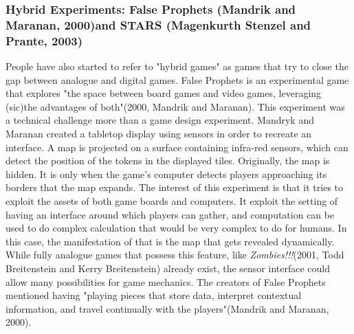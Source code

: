 \subsubsection{Hybrid Experiments: False Prophets (Mandrik and Maranan, 2000)and STARS (Magenkurth Stenzel and Prante, 2003)}
People have also started to refer to "hybrid games" as games that try to close the gap between analogue and digital games. False Prophets is an experimental game that explores "the space between board games and video games, leveraging (sic)the advantages of both"(2000, Mandrik and Maranan). This experiment was a technical challenge more than a game design experiment. Mandryk and Maranan created a tabletop display using sensors in order to recreate an interface. A map is projected on a surface containing infra-red sensors, which can detect the position of the tokens in the displayed tiles. Originally, the map is hidden. It is only when the game's computer detects players approaching its borders that the map expands. The interest of this experiment is that it tries to exploit the assets of both game boards and computers. It exploit the setting of having an interface around which players can gather, and computation can be used to do complex calculation that would be very complex to do for humans. In this case, the manifestation of that is the map that gets revealed dynamically. While fully analogue games  that possess this feature, like \textit{Zombies!!!}(2001, Todd Breitenstein and Kerry Breitenstein) already exist, the sensor interface could allow many possibilities for game mechanics. The creators of False Prophets mentioned having "playing pieces that store data, interpret contextual information, and travel continually with the players"(Mandrik and Maranan, 2000).
\\\\

